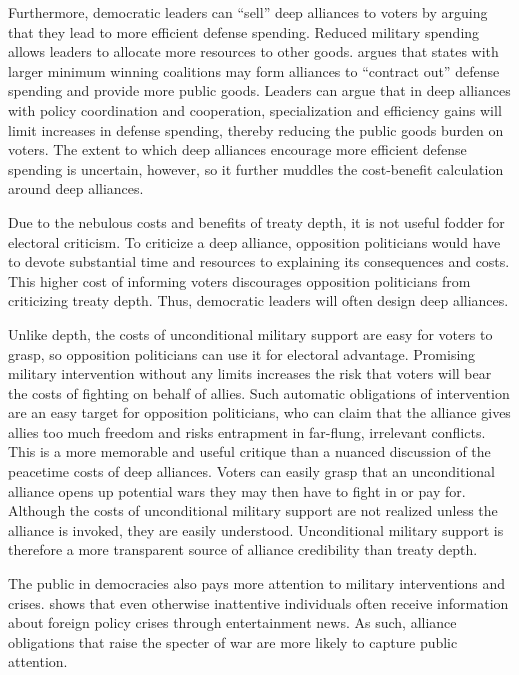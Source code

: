 \documentclass[12pt]{article}
\begin{document}
Furthermore, democratic leaders can ``sell'' deep alliances to voters by arguing that they lead to more efficient defense spending. 
Reduced military spending allows leaders to allocate more resources to other goods.  
\citet{Kimball2010} argues that states with larger minimum winning coalitions may form alliances to ``contract out'' 
defense spending and provide more public goods. 
Leaders can argue that in deep alliances with policy coordination and cooperation, specialization and efficiency gains will limit increases in defense spending, thereby reducing the public goods burden on voters.  
The extent to which deep alliances encourage more efficient defense spending is uncertain, however, so it further muddles the cost-benefit calculation around deep alliances. 


Due to the nebulous costs and benefits of treaty depth, it is not useful fodder for electoral criticism.
To criticize a deep alliance, opposition politicians would have to devote substantial time and resources to explaining its consequences and costs.  
This higher cost of informing voters discourages opposition politicians from criticizing treaty depth. 
Thus, democratic leaders will often design deep alliances. 


Unlike depth, the costs of unconditional military support are easy for voters to grasp, so opposition politicians can use it for electoral advantage. 
Promising military intervention without any limits increases the risk that voters will bear the costs of fighting on behalf of allies. 
Such automatic obligations of intervention are an easy target for opposition politicians, who can claim that the alliance gives allies too much freedom and risks entrapment in far-flung, irrelevant conflicts.  
This is a more memorable and useful critique than a nuanced discussion of the peacetime costs of deep alliances. 
Voters can easily grasp that an unconditional alliance opens up potential wars they may then have to fight in or pay for. 
Although the costs of unconditional military support are not realized unless the alliance is invoked, they are easily understood.
Unconditional military support is therefore a more transparent source of alliance credibility than treaty depth.  


The public in democracies also pays more attention to military interventions and crises. 
\citet{Baum2002} shows that even otherwise inattentive individuals often receive information about foreign policy crises through entertainment news. 
As such, alliance obligations that raise the specter of war are more likely to capture public attention. 
\end{document}
